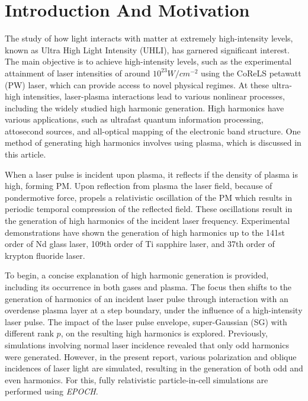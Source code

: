 \documentclass[12pt]{article}
\begin{document}
\section{Introduction And Motivation}
The study of how light interacts with matter at extremely high-intensity levels, known as Ultra High Light Intensity (UHLI), has garnered significant interest.  The main objective is to achieve high-intensity levels, such as the experimental attainment of laser intensities of around $10^{23} W/cm^{-2}$ using the CoReLS petawatt (PW) laser\cite{highintensity}, which can provide access to novel physical regimes. At these ultra-high intensities, laser-plasma interactions lead to various nonlinear processes, including the widely studied high harmonic generation\cite{henri}. High harmonics have various applications, such as ultrafast quantum information processing, attosecond sources, and all-optical mapping of the electronic band structure. One method of generating high harmonics involves using plasma, which is discussed in this article.

When a laser pulse is incident upon plasma, it reflects if the density of plasma is high, forming PM. Upon reflection from plasma the laser field, because of pondermotive force, propels a relativistic oscillation of the PM which results in periodic temporal compression of the reflected field. These oscillations result in the generation of high harmonics of the incident laser frequency.\cite{lichters} Experimental demonstrations have shown the generation of high harmonics up to the 141st order of Nd glass laser\cite{hormonics1}, 109th order of Ti sapphire laser\cite{hormonics2}, and 37th order of krypton fluoride laser\cite{hormonics3}.

To begin, a concise explanation of high harmonic generation is provided, including its occurrence in both gases\cite{gas-main}\cite{gas-second}\cite{hhg-book} and plasma\cite{hhg-relativistic}\cite{hhg-main}\cite{hhg-second}\cite{history-similarity}\cite{universal-spectra}. The focus then shifts to the generation of harmonics of an incident laser pulse through interaction with an overdense plasma layer at a step boundary, under the influence of a high-intensity laser pulse. The impact of the laser pulse envelope, super-Gaussian (SG) with different rank $p$, on the resulting high harmonics is explored. Previously, simulations involving normal laser incidence revealed that only odd harmonics were generated. However, in the present report, various polarization and oblique incidences of laser light are simulated, resulting in the generation of both odd and even harmonics. For this, fully relativistic particle-in-cell simulations are performed using \textit{EPOCH}\cite{EPOCH}.
\end{document}
